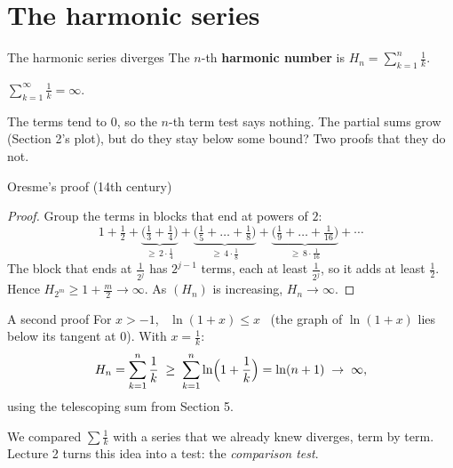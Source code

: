\documentclass[10pt]{wosm-slides}
\begin{document}
\section{The harmonic series}

\begin{frame}{The harmonic series diverges}
  The $n$-th \textbf{harmonic number} is $H_n = \sum_{k=1}^{n} \frac1k$.
  \begin{theorem}
    $\displaystyle\sum_{k=1}^\infty \frac1k = \infty$.
  \end{theorem}
  The terms tend to $0$, so the $n$-th term test says nothing. The partial sums grow
  (Section 2's plot), but do they stay below some bound?
  Two proofs that they do not.
\end{frame}

\begin{frame}{Oresme's proof (14th century)}
  \begin{proof}
    Group the terms in blocks that end at powers of $2$:
    \[ 1 + \tfrac12 + \underbrace{\bigl(\tfrac13 + \tfrac14\bigr)}_{\ge\, 2 \cdot \frac14}
         + \underbrace{\bigl(\tfrac15 + \dots + \tfrac18\bigr)}_{\ge\, 4 \cdot \frac18}
         + \underbrace{\bigl(\tfrac19 + \dots + \tfrac1{16}\bigr)}_{\ge\, 8 \cdot \frac1{16}}
         + \cdots \]
    The block that ends at $\frac{1}{2^j}$ has $2^{j-1}$ terms, each at least $\frac1{2^j}$,
    so it adds at least $\frac12$. Hence $H_{2^m} \ge 1 + \frac m2 \to \infty$.
    As $(H_n)$ is increasing, $H_n \to \infty$.
  \end{proof}
\end{frame}

\begin{frame}{A second proof}
  For $x > -1$, \ $\ln(1 + x) \le x$ \ (the graph of $\ln(1+x)$ lies below its tangent at $0$).
  \pause
  With $x = \frac1k$:
  \[ H_n = \sum_{k=1}^{n} \frac1k \;\ge\; \sum_{k=1}^{n} \ln\Bigl(1 + \frac1k\Bigr)
       = \ln(n+1) \;\to\; \infty , \]
  using the telescoping sum from Section 5.
  \pause
  \begin{remark}
    We compared $\sum \frac1k$ with a series that we already knew diverges, term by term.
    Lecture 2 turns this idea into a test: the \emph{comparison test}.
  \end{remark}
\end{frame}
\end{document}
